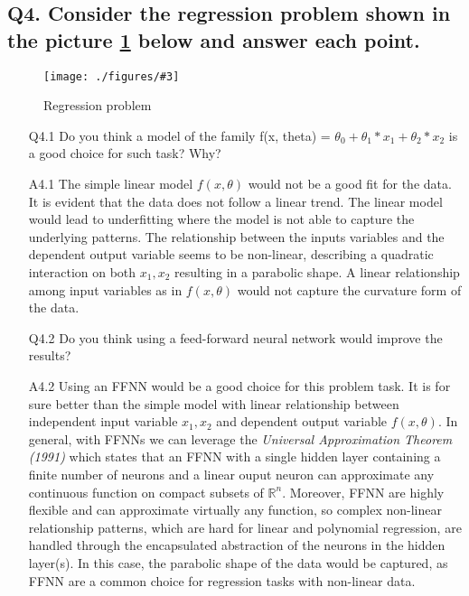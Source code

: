 \documentclass[unicode, 11pt, a4paper]{scrartcl}
\newcommand{\myFigure}[3]{
    \begin{figure}[htbp]
    \centering
    \caption{#1}
    \label{#2}
    \texttt{[image: ./figures/\#3]}
    \end{figure}
}
\begin{document}
\subsection*{
	Q4. Consider the regression problem shown in the picture \ref{fig:ex-q4-regression}
	below and answer each point.
}

\myFigure{Regression problem}{fig:ex-q4-regression}{parabolic.jpg}

\begin{itemize}
	\item[Q4.1] Do you think a model of the family f(x, theta) = $\theta_0 + \theta_1 * x_1 + \theta_2 * x_2$ is a good choice for such task? Why?

	\item[A4.1] The simple linear model $f(x, \theta)$ would not be a good fit for the data.
	      It is evident that the data does not follow a linear trend.
	      The linear model would lead to underfitting where the model is not able
	      to capture the underlying patterns.
	      The relationship between the inputs variables
	      and the dependent output variable seems to be non-linear,
	      describing a quadratic interaction on both $x_1, x_2$ resulting in a parabolic shape.
	      A linear relationship among input variables as in $f(x, \theta)$
	      would not capture the curvature form of the data.

	\item[Q4.2] Do you think using a feed-forward neural network would improve the results?

	\item[A4.2] Using an FFNN would be a good choice for this problem task.
	      It is for sure better than the simple model with linear relationship
	      between independent input variable $x_1, x_2$
	      and dependent output variable $f(x, \theta)$.
	      In general, with FFNNs we can leverage the \textit{Universal Approximation Theorem (1991)}
	      which states that an FFNN with a single hidden layer containing a finite number of neurons
	      and a linear ouput neuron can approximate any continuous function
	      on compact subsets of $\mathbb{R}^n$.
	      Moreover, FFNN are highly flexible and can approximate virtually any function,
	      so complex non-linear relationship patterns,
	      which are hard for linear and polynomial regression,
	      are handled through the encapsulated abstraction of the neurons in the hidden layer(s).
	      In this case, the parabolic shape of the data would be captured,
	      as FFNN are a common choice for regression tasks with non-linear data.

\end{itemize}
\end{document}
